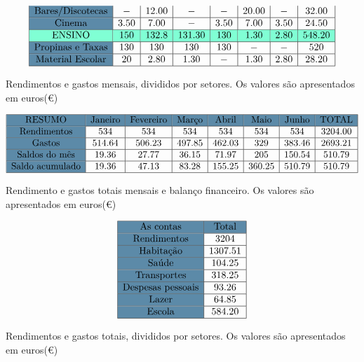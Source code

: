 \documentclass[11pt]{report}
\begin{document}
\begin{table} [h]
$$\begin{array}{|>{\columncolor{airforceblue}}c|c|c|c|c|c|c|c|}
\text{Bares/Discotecas} & - & 12.00 & - & - & 20.00 & - & 32.00 \\ \hline
\text{Cinema} & 3.50 & 7.00 & - & 3.50 & 7.00 & 3.50 & 24.50 \\ \hline
\rowcolor{aquamarine} \text{ENSINO} & 150 & 132.8 & 131.30 & 130 & 1.30 & 2.80 & 548.20 \\ \hline
\text{Propinas e Taxas} & 130 & 130 & 130 & 130 & - & - & 520 \\ \hline
\text{Material Escolar} & 20 & 2.80 & 1.30 & - & 1.30 & 2.80 & 28.20 \\ \hline
\end{array}$$
\caption{Rendimentos e gastos mensais, divididos por setores. Os valores são apresentados em euros(\euro)}
\end{table}

\begin{table} [h]
$$\begin{array}{|>{\columncolor{airforceblue}}c|c|c|c|c|c|c|c|} \hline
\rowcolor{airforceblue} \text{RESUMO} & \text{Janeiro} & \text{Fevereiro} & \text{Março} & \text{Abril} & \text{Maio} & \text{Junho} & \text{TOTAL} \\ \hline
\text{Rendimentos} & 534 & 534 & 534 & 534 & 534 & 534 & 3204.00 \\ \hline
\text{Gastos} & 514.64 & 506.23 & 497.85 & 462.03 & 329 & 383.46 & 2693.21 \\ \hline
\text{Saldos do mês} & 19.36 & 27.77 & 36.15 & 71.97 & 205 & 150.54 & 510.79 \\ \hline
\text{Saldo acumulado} & 19.36 & 47.13 & 83.28 & 155.25 & 360.25 & 510.79 & 510.79 \\ \hline
\end{array}$$
\caption{Rendimento e gastos totais mensais e balanço financeiro. Os valores são apresentados em euros(\euro)}
\end{table}

\begin{table} [h]
$$\begin{array}{|>{\columncolor{airforceblue}}c|c|} \hline
\rowcolor{airforceblue} \text{As contas} & \text{Total} \\ \hline
\text{Rendimentos} & 3204 \\ \hline
\text{Habitação} & 1307.51 \\ \hline
\text{Saúde} & 104.25 \\ \hline
\text{Transportes} & 318.25 \\ \hline
\text{Despesas pessoais} & 93.26 \\ \hline
\text{Lazer} & 64.85 \\ \hline
\text{Escola} & 584.20 \\ \hline
\end{array}$$
\caption{Rendimentos e gastos totais, divididos por setores. Os valores são apresentados em euros(\euro)}
\end{table}
\end{document}

